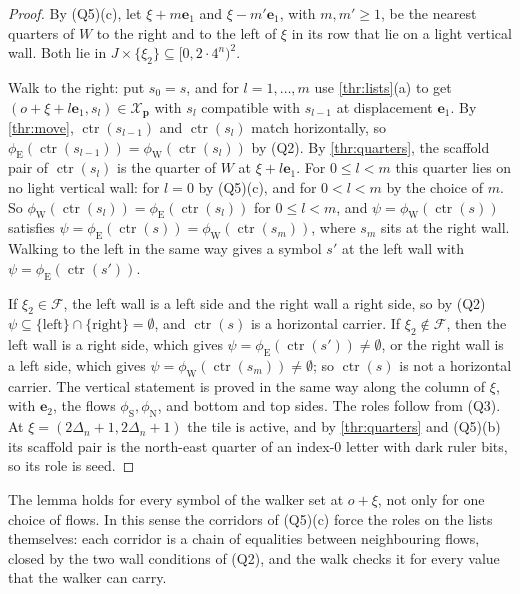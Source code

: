 \begin{proof}
By (Q5)(c), let $\xi+m\mathbf e_1$ and $\xi-m'\mathbf e_1$, with $m,m'\ge1$, be the nearest quarters of $W$ to the right and to the left of $\xi$ in its row that lie on a light vertical wall. Both lie in $J\times\{\xi_2\}\subseteq[0,2\cdot4^n)^2$.

Walk to the right: put $s_0=s$, and for $l=1,\dots,m$ use \cref{thr:lists}(a) to get $(o+\xi+l\mathbf e_1,s_l)\in\mathcal X_{\mathbf p}$ with $s_l$ compatible with $s_{l-1}$ at displacement $\mathbf e_1$. By \cref{thr:move}, $\operatorname{ctr}(s_{l-1})$ and $\operatorname{ctr}(s_l)$ match horizontally, so $\phi_{\mathrm E}(\operatorname{ctr}(s_{l-1}))=\phi_{\mathrm W}(\operatorname{ctr}(s_l))$ by (Q2). By \cref{thr:quarters}, the scaffold pair of $\operatorname{ctr}(s_l)$ is the quarter of $W$ at $\xi+l\mathbf e_1$. For $0\le l<m$ this quarter lies on no light vertical wall: for $l=0$ by (Q5)(c), and for $0<l<m$ by the choice of $m$. So $\phi_{\mathrm W}(\operatorname{ctr}(s_l))=\phi_{\mathrm E}(\operatorname{ctr}(s_l))$ for $0\le l<m$, and $\psi=\phi_{\mathrm W}(\operatorname{ctr}(s))$ satisfies $\psi=\phi_{\mathrm E}(\operatorname{ctr}(s))=\phi_{\mathrm W}(\operatorname{ctr}(s_m))$, where $s_m$ sits at the right wall. Walking to the left in the same way gives a symbol $s'$ at the left wall with $\psi=\phi_{\mathrm E}(\operatorname{ctr}(s'))$.

If $\xi_2\in\mathcal F$, the left wall is a left side and the right wall a right side, so by (Q2) $\psi\subseteq\{\mathrm{left}\}\cap\{\mathrm{right}\}=\emptyset$, and $\operatorname{ctr}(s)$ is a horizontal carrier. If $\xi_2\notin\mathcal F$, then the left wall is a right side, which gives $\psi=\phi_{\mathrm E}(\operatorname{ctr}(s'))\ne\emptyset$, or the right wall is a left side, which gives $\psi=\phi_{\mathrm W}(\operatorname{ctr}(s_m))\ne\emptyset$; so $\operatorname{ctr}(s)$ is not a horizontal carrier. The vertical statement is proved in the same way along the column of $\xi$, with $\mathbf e_2$, the flows $\phi_{\mathrm S},\phi_{\mathrm N}$, and bottom and top sides. The roles follow from (Q3). At $\xi=(2\Delta_n+1,2\Delta_n+1)$ the tile is active, and by \cref{thr:quarters} and (Q5)(b) its scaffold pair is the north-east quarter of an index-$0$ letter with dark ruler bits, so its role is seed.
\end{proof}

The lemma holds for every symbol of the walker set at $o+\xi$, not only for one choice of flows. In this sense the corridors of (Q5)(c) force the roles on the lists themselves: each corridor is a chain of equalities between neighbouring flows, closed by the two wall conditions of (Q2), and the walk checks it for every value that the walker can carry.

